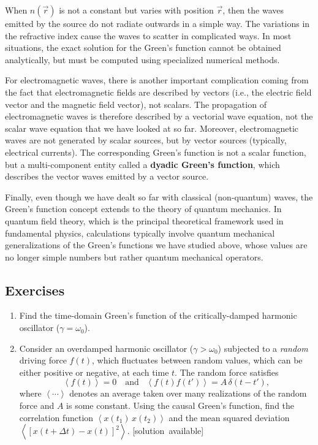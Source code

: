 \documentclass[10pt,a4paper]{article}
\begin{document}
When $n(\vec{r})$ is not a constant but varies with position
$\vec{r}$, then the waves emitted by the source do not radiate
outwards in a simple way. The variations in the refractive index cause
the waves to scatter in complicated ways. In most situations, the
exact solution for the Green's function cannot be obtained
analytically, but must be computed using specialized numerical
methods.

For electromagnetic waves, there is another important complication
coming from the fact that electromagnetic fields are described by
vectors (i.e., the electric field vector and the magnetic field
vector), not scalars.  The propagation of electromagnetic waves is
therefore described by a vectorial wave equation, not the scalar wave
equation that we have looked at so far. Moreover, electromagnetic
waves are not generated by scalar sources, but by vector sources
(typically, electrical currents). The corresponding Green's function
is not a scalar function, but a multi-component entity called a
\textbf{dyadic Green's function}, which describes the vector waves
emitted by a vector source.

Finally, even though we have dealt so far with classical (non-quantum)
waves, the Green's function concept extends to the theory of quantum
mechanics. In quantum field theory, which is the principal theoretical
framework used in fundamental physics, calculations typically involve
quantum mechanical generalizations of the Green's functions we have
studied above, whose values are no longer simple numbers but rather
quantum mechanical operators.

\clearpage
\subsection{Exercises}\label{exercises}

\begin{enumerate}
\item
  Find the time-domain Green's function of the critically-damped
  harmonic oscillator ($\gamma = \omega_0$).
\item
  Consider an overdamped harmonic oscillator ($\gamma > \omega_0$)
  subjected to a \emph{random} driving force $f(t)$, which fluctuates
  between random values, which can be either positive or negative, at
  each time $t$. The random force satisfies
  \begin{equation}
    \left\langle f(t)\right\rangle = 0 \quad\mathrm{and}\;\;\;\left\langle f(t) f(t')\right\rangle = A \, \delta(t-t'),
  \end{equation}
  where $\left\langle\cdots\right\rangle$ denotes an average taken
  over many realizations of the random force and $A$ is some constant.
  Using the causal Green's function, find the correlation function
  $\left\langle x(t_1)\, x(t_2) \right\rangle$ and the mean squared
  deviation $\left\langle [x(t+\Delta t) - x(t)]^2 \right\rangle.$
  \vskip -0.05in
  \hfill{\scriptsize [solution~available]}
\end{enumerate}
\end{document}
